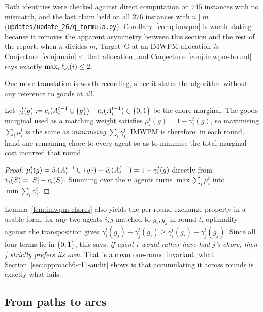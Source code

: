 Both identities were checked against direct computation on $745$ instances with
no mismatch, and the last claim held on all $276$ instances with $n \mid m$
(\texttt{updates/update\_26/q\_formula.py}). Corollary~\ref{cor:q-imwpm} is worth
stating because it removes the apparent asymmetry between this section and the
rest of the report: when $n$ divides $m$, Target~G at an IMWPM allocation
\emph{is} Conjecture~\ref{conj:main} at that allocation, and
Conjecture~\ref{conj:imwpm-bound} says exactly $\max_i \ell_{\mathcal{A}}(i) \le 2$.

One more translation is worth recording, since it states the algorithm without
any reference to goods at all.

\begin{lemma}
\label{lem:imwpm-chores}
Let $\gamma_i^t(g) := c_i(A_{i}^{t-1} \cup \left\{g\right\}) -
c_i(A_{i}^{t-1}) \in \left\{0,1\right\}$ be the chore marginal. The goods marginal
used as a matching weight satisfies $\mu_i^t(g) = 1 - \gamma_i^t(g)$, so
maximising $\sum_i \mu_i^t$ is the same as \emph{minimising} $\sum_i \gamma_i^t$.
IMWPM is therefore: in each round, hand one remaining chore to every agent so as
to minimise the total marginal cost incurred that round.
\end{lemma}

\begin{proof}
$\mu_i^t(g) = \tilde v_i(A_{i}^{t-1} \cup \left\{g\right\}) -
\tilde v_i(A_{i}^{t-1}) = 1 - \gamma_i^t(g)$ directly from
$\tilde v_i(S) = \left\lvert S\right\rvert - c_i(S)$. Summing over the $n$ agents turns
$\max \sum_i \mu_i^t$ into $\min \sum_i \gamma_i^t$.
\end{proof}

Lemma~\ref{lem:imwpm-chores} also yields the per-round exchange property in a
usable form: for any two agents $i,j$ matched to $g_i, g_j$ in round $t$,
optimality against the transposition gives $\gamma_i^t(g_j) + \gamma_j^t(g_i) \ge
\gamma_i^t(g_i) + \gamma_j^t(g_j)$. Since all four terms lie in $\left\{0,1\right\}$, this
says: \emph{if agent $i$ would rather have had $j$'s chore, then $j$ strictly
prefers its own}. That is a clean one-round invariant; what
Section~\ref{sec:approach6-r11-audit} shows is that accumulating it across rounds
is exactly what fails.

\subsection{From paths to arcs}
\label{sec:approach6-arcs}

